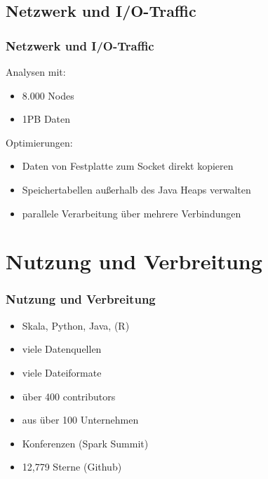 \documentclass[hyperref={pdfpagelabels=false}]{beamer}
\begin{document}
 \subsection{Netzwerk und I/O-Traffic}
\begin{frame} [t]
\frametitle{Netzwerk und I/O-Traffic}
Analysen mit:
\begin{itemize}
	\item 8.000 Nodes
	\item 1PB Daten	
\end{itemize}

\vspace{0.4cm}
 {
Optimierungen:
\begin{itemize}
	\item Daten von Festplatte zum Socket direkt kopieren
	\item Speichertabellen außerhalb des Java Heaps verwalten
	\item parallele Verarbeitung über mehrere Verbindungen	
\end{itemize}
}
\end{frame}


\section{Nutzung und Verbreitung}
\begin{frame} [t]
\frametitle{Nutzung und Verbreitung}

\begin{itemize}
	\item Skala, Python, Java, (R)
	\item viele Datenquellen
	\item viele Dateiformate	
	\item über 400 contributors
	\item aus über 100 Unternehmen
	\item Konferenzen (Spark Summit)
	\item 12,779 Sterne (Github)
\end{itemize}

 {
	\begin{figure}[h]
		\centering
	\end{figure}
}

\end{frame}
\end{document}
